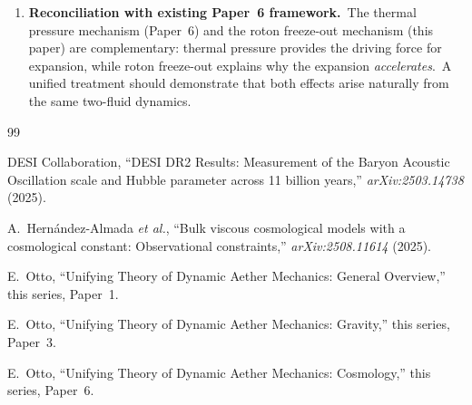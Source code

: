 \documentclass[12pt,letterpaper]{article}
\begin{document}
\begin{enumerate}[leftmargin=2em]
  \item \textbf{Reconciliation with existing Paper~6 framework.}\ The thermal
    pressure mechanism (Paper~6) and the roton freeze-out mechanism (this paper)
    are complementary: thermal pressure provides the driving force for expansion,
    while roton freeze-out explains why the expansion \emph{accelerates}.\ A
    unified treatment should demonstrate that both effects arise naturally from
    the same two-fluid dynamics.
\end{enumerate}


\begin{thebibliography}{99}

DESI Collaboration,
``DESI DR2 Results: Measurement of the Baryon Acoustic Oscillation
scale and Hubble parameter across 11 billion years,''
\textit{arXiv:2503.14738} (2025).

A.~Hern\'{a}ndez-Almada \textit{et al.},
``Bulk viscous cosmological models with a cosmological constant:
Observational constraints,''
\textit{arXiv:2508.11614} (2025).

E.~Otto,
``Unifying Theory of Dynamic Aether Mechanics: General Overview,''
this series, Paper~1.

E.~Otto,
``Unifying Theory of Dynamic Aether Mechanics: Gravity,''
this series, Paper~3.

E.~Otto,
``Unifying Theory of Dynamic Aether Mechanics: Cosmology,''
this series, Paper~6.

\end{thebibliography}
\end{document}
